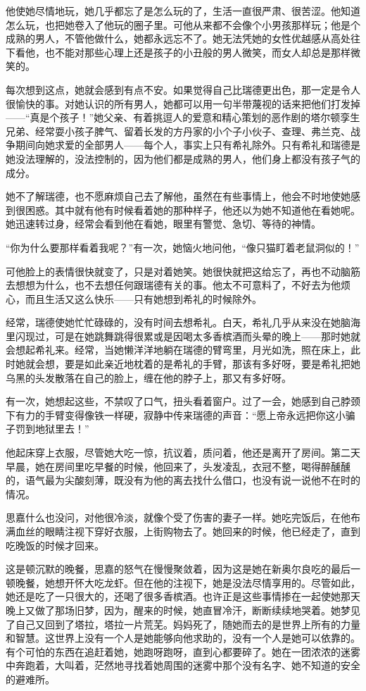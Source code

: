 \par 他使她尽情地玩，她几乎都忘了是怎么玩的了，生活一直很严肃、很苦涩。他知道怎么玩，也把她卷入了他玩的圈子里。可他从来都不会像个小男孩那样玩；他是个成熟的男人，不管他做什么，她都永远忘不了。她无法凭她的女性优越感从高处往下看他，也不能对那些心理上还是孩子的小丑般的男人微笑，而女人却总是那样微笑的。
\par 每次想到这点，她就会感到有点不安。如果觉得自己比瑞德更出色，那一定是令人很愉快的事。对她认识的所有男人，她都可以用一句半带蔑视的话来把他们打发掉——“真是个孩子！”她父亲、有着挑逗人的爱意和精心策划的恶作剧的塔尔顿孪生兄弟、经常耍小孩子脾气、留着长发的方丹家的小个子小伙子、查理、弗兰克、战争期间向她求爱的全部男人——每个人，事实上只有希礼除外。只有希礼和瑞德是她没法理解的，没法控制的，因为他们都是成熟的男人，他们身上都没有孩子气的成分。
\par 她不了解瑞德，也不愿麻烦自己去了解他，虽然在有些事情上，他会不时地使她感到很困惑。其中就有他有时候看着她的那种样子，他还以为她不知道他在看她呢。她迅速转过身，经常会看到他在看她，眼里有警觉、急切、等待的神情。
\par “你为什么要那样看着我呢？”有一次，她恼火地问他，“像只猫盯着老鼠洞似的！”
\par 可他脸上的表情很快就变了，只是对着她笑。她很快就把这给忘了，再也不动脑筋去想想为什么，也不去想任何跟瑞德有关的事。他太不可意料了，不好去为他烦心，而且生活又这么快乐——只有她想到希礼的时候除外。
\par 经常，瑞德使她忙忙碌碌的，没有时间去想希礼。白天，希礼几乎从来没在她脑海里闪现过，可是在她跳舞跳得很累或是因喝太多香槟酒而头晕的晚上——那时她就会想起希礼来。经常，当她懒洋洋地躺在瑞德的臂弯里，月光如洗，照在床上，此时她就会想，要是如此亲近地枕着的是希礼的手臂，那该有多好呀，要是希礼把她乌黑的头发散落在自己的脸上，缠在他的脖子上，那又有多好呀。
\par 有一次，她想起这些，不禁叹了口气，扭头看着窗户。过了一会，她感到自己脖颈下有力的手臂变得像铁一样硬，寂静中传来瑞德的声音：“愿上帝永远把你这小骗子罚到地狱里去！”
\par 他起床穿上衣服，尽管她大吃一惊，抗议着，质问着，他还是离开了房间。第二天早晨，她在房间里吃早餐的时候，他回来了，头发凌乱，衣冠不整，喝得醉醺醺的，语气最为尖酸刻薄，既没有为他的离去找什么借口，也没有说一说他不在时的情况。
\par 思嘉什么也没问，对他很冷淡，就像个受了伤害的妻子一样。她吃完饭后，在他布满血丝的眼睛注视下穿好衣服，上街购物去了。她回来的时候，他已经走了，直到吃晚饭的时候才回来。
\par 这是顿沉默的晚餐，思嘉的怒气在慢慢聚敛着，因为这是她在新奥尔良吃的最后一顿晚餐，她想开怀大吃龙虾。但在他的注视下，她是没法尽情享用的。尽管如此，她还是吃了一只很大的，还喝了很多香槟酒。也许正是这些事情掺在一起使她那天晚上又做了那场旧梦，因为，醒来的时候，她直冒冷汗，断断续续地哭着。她梦见了自己又回到了塔拉，塔拉一片荒芜。妈妈死了，随她而去的是世界上所有的力量和智慧。这世界上没有一个人是她能够向他求助的，没有一个人是她可以依靠的。有个可怕的东西在追赶着她，她跑呀跑呀，直到心都要碎了。她在一团浓浓的迷雾中奔跑着，大叫着，茫然地寻找着她周围的迷雾中那个没有名字、她不知道的安全的避难所。
